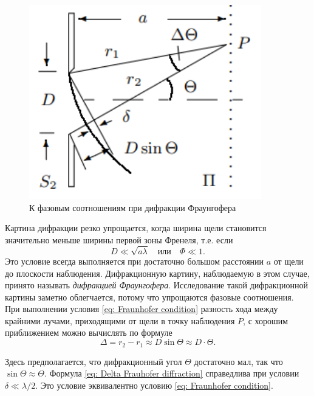 \documentclass[a4paper,12pt]{article}
\begin{document}
\begin{figure}\label{fig: Frauhofer phase difference}
    \begin{center}
    \vspace{-20pt}
        \includegraphics[width = 0.9\textwidth]{Fraunhofer diffraction phase difference.png}
    \end{center}
    \caption{К фазовым соотношениям при дифракции Фраунгофера}
\end{figure}
Картина дифракции резко упрощается, когда ширина щели становится значительно меньше ширины первой зоны Френеля, т.е. если 
\begin{equation}\label{eq: Fraunhofer condition}
    D \ll \sqrt{a\lambda} \quad \text{или} \quad \Phi \ll 1.
\end{equation}
Это условие всегда выполняется при достаточно большом расстоянии $a$ от щели до плоскости наблюдения. Дифракционную картину, наблюдаемую в этом случае, принято называть \textit{дифракцией Фраунгофера}. Исследование такой дифракционной картины заметно облегчается, потому что упрощаются фазовые соотношения. При выполнении условия \eqref{eq: Fraunhofer condition} разность хода между крайними лучами, приходящими от щели в точку наблюдения $P$, с хорошим приближением можно вычислять по формуле
\begin{equation}\label{eq: Delta Frauhofer diffraction}
    \Delta = r_2 - r_1 \approx D \sin\Theta \approx D \cdot \Theta.
\end{equation}

Здесь предполагается, что дифракционный угол $\Theta$ достаточно мал, так что $\sin\Theta \approx \Theta$. Формула \eqref{eq: Delta Frauhofer diffraction} справедлива при условии $\delta \ll \lambda / 2$. Это условие эквивалентно условию \eqref{eq: Fraunhofer condition}.
\end{document}
